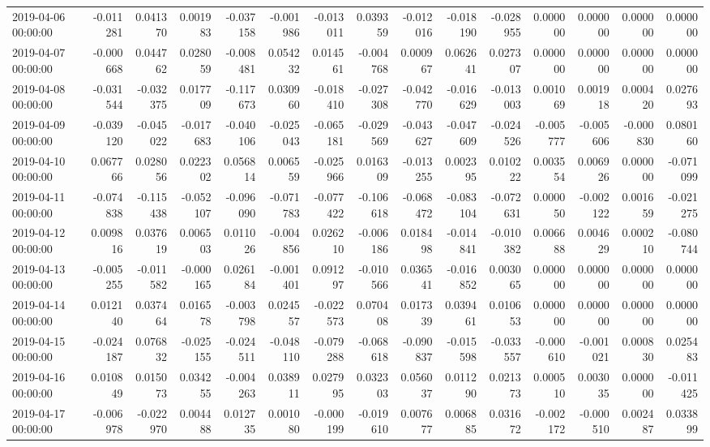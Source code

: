\begin{tabular}{lrrrrrrrrrrrrrr}
2019-04-06 00:00:00 & -0.011281 & 0.041370 & 0.001983 & -0.037158 & -0.001986 & -0.013011 & 0.039359 & -0.012016 & -0.018190 & -0.028955 & 0.000000 & 0.000000 & 0.000000 & 0.000000 \\
2019-04-07 00:00:00 & -0.000668 & 0.044762 & 0.028059 & -0.008481 & 0.054232 & 0.014561 & -0.004768 & 0.000967 & 0.062641 & 0.027307 & 0.000000 & 0.000000 & 0.000000 & 0.000000 \\
2019-04-08 00:00:00 & -0.031544 & -0.032375 & 0.017709 & -0.117673 & 0.030960 & -0.018410 & -0.027308 & -0.042770 & -0.016629 & -0.013003 & 0.001069 & 0.001918 & 0.000420 & 0.027693 \\
2019-04-09 00:00:00 & -0.039120 & -0.045022 & -0.017683 & -0.040106 & -0.025043 & -0.065181 & -0.029569 & -0.043627 & -0.047609 & -0.024526 & -0.005777 & -0.005606 & -0.000830 & 0.080160 \\
2019-04-10 00:00:00 & 0.067766 & 0.028056 & 0.022302 & 0.056814 & 0.006559 & -0.025966 & 0.016309 & -0.013255 & 0.002395 & 0.010222 & 0.003554 & 0.006926 & 0.000000 & -0.071099 \\
2019-04-11 00:00:00 & -0.074838 & -0.115438 & -0.052107 & -0.096090 & -0.071783 & -0.077422 & -0.106618 & -0.068472 & -0.083104 & -0.072631 & 0.000050 & -0.002122 & 0.001659 & -0.021275 \\
2019-04-12 00:00:00 & 0.009816 & 0.037619 & 0.006503 & 0.011026 & -0.004856 & 0.026210 & -0.006186 & 0.018498 & -0.014841 & -0.010382 & 0.006688 & 0.004629 & 0.000210 & -0.080744 \\
2019-04-13 00:00:00 & -0.005255 & -0.011582 & -0.000165 & 0.026184 & -0.001401 & 0.091297 & -0.010566 & 0.036541 & -0.016852 & 0.003065 & 0.000000 & 0.000000 & 0.000000 & 0.000000 \\
2019-04-14 00:00:00 & 0.012140 & 0.037464 & 0.016578 & -0.003798 & 0.024557 & -0.022573 & 0.070408 & 0.017339 & 0.039461 & 0.010653 & 0.000000 & 0.000000 & 0.000000 & 0.000000 \\
2019-04-15 00:00:00 & -0.024187 & 0.076832 & -0.025155 & -0.024511 & -0.048110 & -0.079288 & -0.068618 & -0.090837 & -0.015598 & -0.033557 & -0.000610 & -0.001021 & 0.000830 & 0.025483 \\
2019-04-16 00:00:00 & 0.010849 & 0.015073 & 0.034255 & -0.004263 & 0.038911 & 0.027995 & 0.032303 & 0.056037 & 0.011290 & 0.021373 & 0.000510 & 0.003035 & 0.000000 & -0.011425 \\
2019-04-17 00:00:00 & -0.006978 & -0.022970 & 0.004488 & 0.012735 & 0.001080 & -0.000199 & -0.019610 & 0.007677 & 0.006885 & 0.031672 & -0.002172 & -0.000510 & 0.002487 & 0.033899 \\

\end{tabular}
